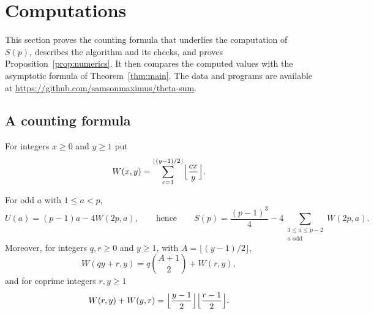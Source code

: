\section{Computations}\label{sec:computations}

This section proves the counting formula that underlies the computation of $S(p)$, describes the algorithm and its checks, and proves Proposition~\ref{prop:numerics}. It then compares the computed values with the asymptotic formula of Theorem~\ref{thm:main}. The data and programs are available at \url{https://github.com/samsonmaximus/theta-sum}.

\subsection{A counting formula}
For integers $x\ge0$ and $y\ge1$ put
\[
W(x,y)=\sum_{c=1}^{\lfloor(y-1)/2\rfloor}\Bigl\lfloor\frac{cx}{y}\Bigr\rfloor .
\]

\begin{lemma}\label{lem:counting}
For odd $a$ with $1\le a<p$,
\[
U(a)=(p-1)a-4W(2p,a),\qquad\text{hence}\qquad S(p)=\frac{(p-1)^3}4-4\sum_{\substack{3\le a\le p-2\\ a\text{ odd}}}W(2p,a).
\]
Moreover, for integers $q,r\ge0$ and $y\ge1$, with $A=\lfloor(y-1)/2\rfloor$,
\begin{equation}\label{eq:Lambda-shift}
W(qy+r,y)=q\binom{A+1}2+W(r,y),
\end{equation}
and for coprime integers $r,y\ge1$
\begin{equation}\label{eq:Lambda-recip}
W(r,y)+W(y,r)=\Bigl\lfloor\frac{y-1}2\Bigr\rfloor\Bigl\lfloor\frac{r-1}2\Bigr\rfloor .
\end{equation}
\end{lemma}

